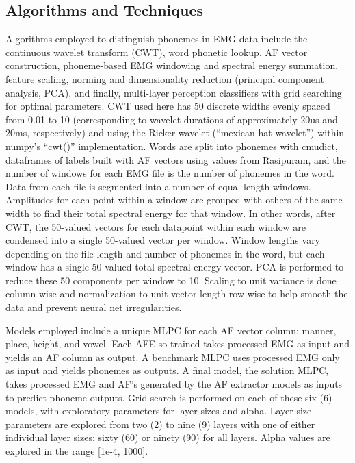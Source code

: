 \documentclass[conference]{IEEEtran}
\begin{document}
\subsection{Algorithms and Techniques}
Algorithms employed to distinguish phonemes in EMG data include the continuous wavelet transform (CWT), word phonetic lookup, AF vector construction, phoneme-based EMG windowing and spectral energy summation, feature scaling, norming and dimensionality reduction (principal component analysis, PCA), and finally, multi-layer perception classifiers with grid searching for optimal parameters. CWT used here has 50 discrete widths evenly spaced from 0.01 to 10 (corresponding to wavelet durations of approximately 20us and 20ms, respectively) and using the Ricker wavelet (“mexican hat wavelet”) within numpy's “cwt()” implementation. Words are split into phonemes with cmudict, dataframes of labels built with AF vectors using values from Rasipuram, and the number of windows for each EMG file is the number of phonemes in the word. Data from each file is segmented into a number of equal length windows. Amplitudes for each point within a window are grouped with others of the same width to find their total spectral energy for that window. In other words, after CWT, the 50-valued vectors for each datapoint within each window are condensed into a single 50-valued vector per window.  Window lengths vary depending on the file length and number of phonemes in the word, but each window has a single 50-valued total spectral energy vector. PCA is performed to reduce these 50 components per window to 10. Scaling to unit variance is done column-wise and normalization to unit vector length row-wise to help smooth the data and prevent neural net irregularities.

Models employed include a unique MLPC for each AF vector column: manner, place, height, and vowel. Each AFE so trained takes processed EMG as input and yields an AF column as output. A benchmark MLPC uses processed EMG only as input and yields phonemes as outputs. A final model, the solution MLPC, takes processed EMG and AF's generated by the AF extractor models as inputs to predict phoneme outputs. Grid search is performed on each of these six (6) models, with exploratory parameters for layer sizes and alpha. Layer size parameters are explored from two (2) to nine (9) layers with one of either individual layer sizes: sixty (60) or ninety (90) for all layers. Alpha values are explored in the range [1e-4, 1000].
\end{document}
